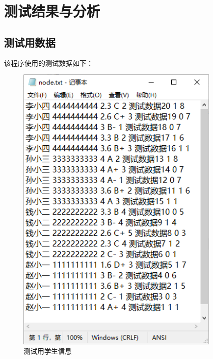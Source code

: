 \documentclass[fontset=windows]{article}
\begin{document}
\section{测试结果与分析}
\subsection{测试用数据}
该程序使用的测试数据如下：

\begin{figure}[h!]
	\begin{center}
		\includegraphics[width = 10cm]{测试数据.png}
		\vspace{0.5cm}
		\caption{测试用学生信息}
	\end{center}
\end{figure}
\end{document}
